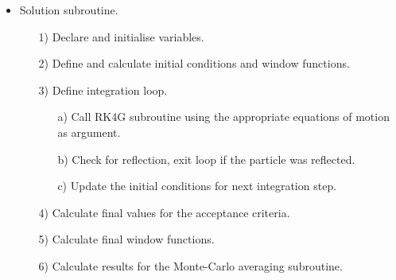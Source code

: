 \documentclass[xetex,mathserif,serif]{beamer}
\begin{document}
\begin{frame}
{\begin{itemize}
\item Solution subroutine.
\begin{enumerate}
\item[1)] Declare and initialise variables.
\item[2)] Define and calculate initial conditions and window functions.
\item[3)] Define integration loop.
\begin{enumerate}
\item[a)] Call RK4G subroutine using the appropriate equations of motion as argument.
\item[b)] Check for reflection, exit loop if the particle was reflected.
\item[c)] Update the initial conditions for next integration step.
\end{enumerate}
\item[4)] Calculate final values for the acceptance criteria.
\item[5)] Calculate final window functions.
\item[6)] Calculate results for the Monte-Carlo averaging subroutine.
\end{enumerate}
\end{itemize}
}
\end{frame}
\end{document}

